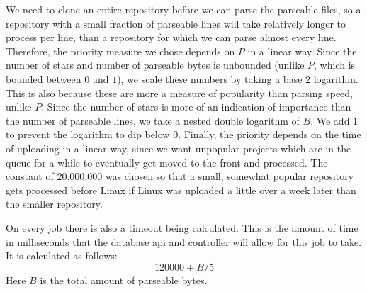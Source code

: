 \documentclass[../Main.tex]{subfiles}
\begin{document}
We need to clone an entire repository before we can parse the parseable files, so a repository with a small fraction of parseable lines will take relatively longer to process per line, than a repository for which we can parse almost every line. Therefore, the priority measure we chose depends on $P$ in a linear way. Since the number of stars and number of parseable bytes is unbounded (unlike $P$, which is bounded between $0$ and $1$), we scale these numbers by taking a base $2$ logarithm. This is also because these are more a measure of popularity than parsing speed, unlike $P$. Since the number of stars is more of an indication of importance than the number of parseable lines, we take a nested double logarithm of $B$. We add $1$ to prevent the logarithm to dip below $0$. Finally, the priority depends on the time of uploading in a linear way, since we want unpopular projects which are in the queue for a while to eventually get moved to the front and processed. The constant of $20.000.000$ was chosen so that a small, somewhat popular repository gets processed before Linux if Linux was uploaded a little over a week later than the smaller repository.

On every job there is also a timeout being calculated. This is the amount of time in milliseconds that the database api and controller will allow for this job to take. It is calculated as follows: $$120000 + B/5$$ Here $B$ is the total amount of parseable bytes.
\end{document}
